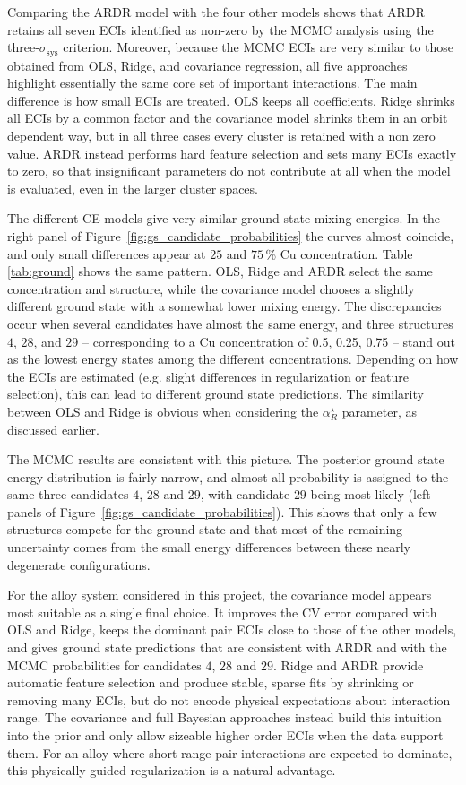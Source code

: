 \documentclass[a4paper, 12pt]{article}
\begin{document}
Comparing the ARDR model with the four other models shows that ARDR retains all seven ECIs identified as non-zero by the MCMC analysis using the three-$\sigma_\text{sys}$ criterion. Moreover, because the MCMC ECIs are very similar to those obtained from OLS, Ridge, and covariance regression, all five approaches highlight essentially the same core set of important interactions. The main difference is how small ECIs are treated. OLS keeps all coefficients, Ridge shrinks all ECIs by a common factor and the covariance model shrinks them in an orbit dependent way, but in all three cases every cluster is retained with a non zero value. ARDR instead performs hard feature selection and sets many ECIs exactly to zero, so that insignificant parameters do not contribute at all when the model is evaluated, even in the larger cluster spaces.

The different CE models give very similar ground state mixing energies. In the right panel of Figure~\ref{fig:gs_candidate_probabilities} the curves almost coincide, and only small differences appear at $25$ and $75$\,\% Cu concentration. Table \ref{tab:ground} shows the same pattern. OLS, Ridge and ARDR select the same concentration and structure, while the covariance model chooses a slightly different ground state with a somewhat lower mixing energy. The discrepancies occur when several candidates have almost the same energy, and three structures $4$, $28$, and $29$ -- corresponding to a Cu concentration of 0.5, 0.25, 0.75 -- stand out as the lowest energy states among the different concentrations. Depending on how the ECIs are estimated (e.g. slight differences in regularization or feature selection), this can lead to different ground state predictions. The similarity between OLS and Ridge is obvious when considering the $\alpha^\star_R$ parameter, as discussed earlier. 

The MCMC results are consistent with this picture. The posterior ground state energy distribution is fairly narrow, and almost all probability is assigned to the same three candidates $4$, $28$ and $29$, with candidate $29$ being most likely (left panels of Figure~\ref{fig:gs_candidate_probabilities}). This shows that only a few structures compete for the ground state and that most of the remaining uncertainty comes from the small energy differences between these nearly degenerate configurations.

For the alloy system considered in this project, the covariance model appears most suitable as a single final choice. It improves the CV error compared with OLS and Ridge, keeps the dominant pair ECIs close to those of the other models, and gives ground state predictions that are consistent with ARDR and with the MCMC probabilities for candidates $4$, $28$ and $29$. Ridge and ARDR provide automatic feature selection and produce stable, sparse fits by shrinking or removing many ECIs, but do not encode physical expectations about interaction range. The covariance and full Bayesian approaches instead build this intuition into the prior and only allow sizeable higher order ECIs when the data support them. For an alloy where short range pair interactions are expected to dominate, this physically guided regularization is a natural advantage.

\printbibliography
\end{document}
